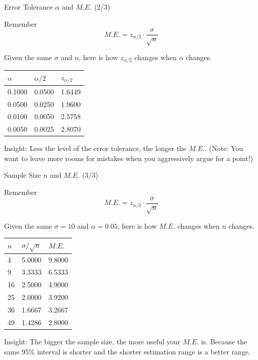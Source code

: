 \documentclass{beamer}
\begin{document}
\begin{frame}{Error Tolerance $\alpha$ and $M.E.$ (2/3)}

Remember 
$$ M.E. = z_{\alpha/2} \cdot \frac{\sigma}{\sqrt{n}} $$

Given the same $\sigma$ and $n$, here is how $z_{\alpha/2}$ changes when $\alpha$ changes.

\begin{center}
\begin{tabular}{l|l|l}
\hline
$\alpha$ & $\alpha/2$ & $z_{\alpha/2}$ \\ \hline
0.1000   & 0.0500     & 1.6449         \\ \hline
0.0500   & 0.0250     & 1.9600         \\ \hline
0.0100   & 0.0050     & 2.5758         \\ \hline
0.0050   & 0.0025     & 2.8070         \\ \hline
\end{tabular}
\end{center}

Insight: Less the level of the error tolerance, the longer the $M.E.$.
(Note: You want to leave more rooms for mistakes when you aggressively argue for a point!)

\end{frame}



\begin{frame}{Sample Size $n$ and $M.E.$ (3/3)}

Remember 
$$ M.E. = z_{\alpha/2} \cdot \frac{\sigma}{\sqrt{n}} $$

Given the same $\sigma = 10$ and $\alpha = 0.05$, here is how $M.E.$ changes when $n$ changes.

\begin{center}
\begin{tabular}{l|l|l}
\hline
$n$ & $\sigma/\sqrt{n}$ & $M.E.$ \\ \hline
4   & 5.0000     & 9.8000 \\ \hline
9   & 3.3333     & 6.5333 \\ \hline
16  & 2.5000     & 4.9000 \\ \hline
25  & 2.0000     & 3.9200 \\ \hline
36  & 1.6667     & 3.2667 \\ \hline
49  & 1.4286     & 2.8000 \\ \hline
\end{tabular}
\end{center}

Insight: The bigger the sample size, the more useful your $M.E.$ is. Because the same 95\% interval is shorter and the shorter estimation range is a better range. 


\end{frame}
\end{document}
